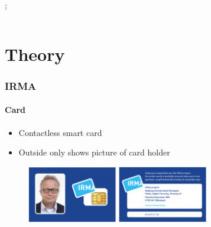 \documentclass[hyperref={urlcolor=black, citecolor=black, pdfpagemode=UseNone, pdfpagelayout=SinglePage, pdfstartview=}]{beamer}
\begin{document}
\begin{frame}
\begin{columns}
    ;
  \end{columns}
\end{frame}

\section{Theory}
\begin{frame}
  \frametitle{IRMA}
  \framesubtitle{Card}  
  \begin{itemize}
    \item Contactless smart card
    \item Outside only shows picture of card holder
  \end{itemize}
  
  \begin{figure}[tb]
    \includegraphics[width=0.35\textwidth]{images/IRMA_card_front.png}
    \hspace*{1mm}
    \includegraphics[width=0.35\textwidth]{images/IRMA_card_back.png}    
  \end{figure}
\end{frame}
\end{document}
